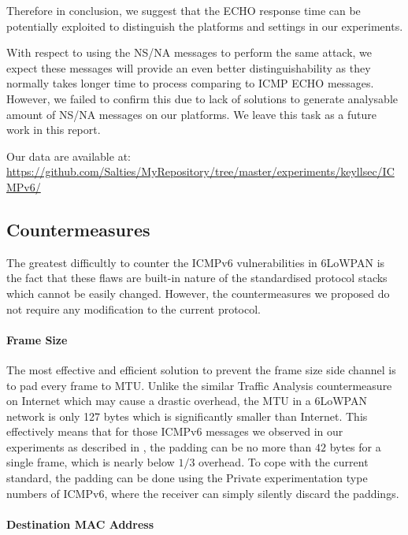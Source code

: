 Therefore in conclusion, we suggest that the ECHO response time can be potentially exploited to distinguish the platforms and settings in our experiments.

With respect to using the NS/NA messages to perform the same attack, we expect these messages will provide an even better distinguishability as they normally takes longer time to process comparing to ICMP ECHO messages. However, we failed to confirm this due to lack of solutions to generate analysable amount of NS/NA messages on our platforms. We leave this task as a future work in this report.

Our data are available at: \\
\url{https://github.com/Salties/MyRepository/tree/master/experiments/keyllsec/ICMPv6/}

\subsection{Countermeasures}

The greatest difficultly to counter the ICMPv6 vulnerabilities in 6LoWPAN is the fact that these flaws are built-in nature of the standardised protocol stacks which cannot be easily changed. However, the countermeasures we proposed do not require any modification to the current protocol.

\paragraph{Frame Size}

The most effective and efficient solution to prevent the frame size side channel is to pad every frame to MTU. Unlike the similar Traffic Analysis countermeasure on Internet which may cause a drastic overhead, the MTU in a 6LoWPAN network is only 127 bytes which is significantly smaller than Internet. This effectively means that for those ICMPv6 messages we observed in our experiments as described in 
, the padding can be no more than $42$ bytes for a single frame, which is nearly below $1/3$ overhead. To cope with the current standard, the padding can be done using the Private experimentation type numbers\cite{rfc4443} of ICMPv6, where the receiver can simply silently discard the paddings.

\paragraph{Destination MAC Address}

